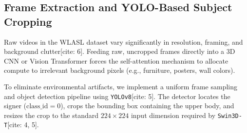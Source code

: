 \documentclass[12pt,a4paper]{article}
\begin{document}
\subsection{Frame Extraction and YOLO-Based Subject Cropping}
Raw videos in the WLASL dataset vary significantly in resolution, framing, and background clutter[cite: 6]. Feeding raw, uncropped frames directly into a 3D CNN or Vision Transformer forces the self-attention mechanism to allocate compute to irrelevant background pixels (e.g., furniture, posters, wall colors). 

To eliminate environmental artifacts, we implement a uniform frame sampling and object detection pipeline using \texttt{YOLOv8}[cite: 5]. The detector locates the signer ($\text{class\_id} = 0$), crops the bounding box containing the upper body, and resizes the crop to the standard $224 \times 224$ input dimension required by \texttt{Swin3D-T}[cite: 4, 5].
\end{document}
